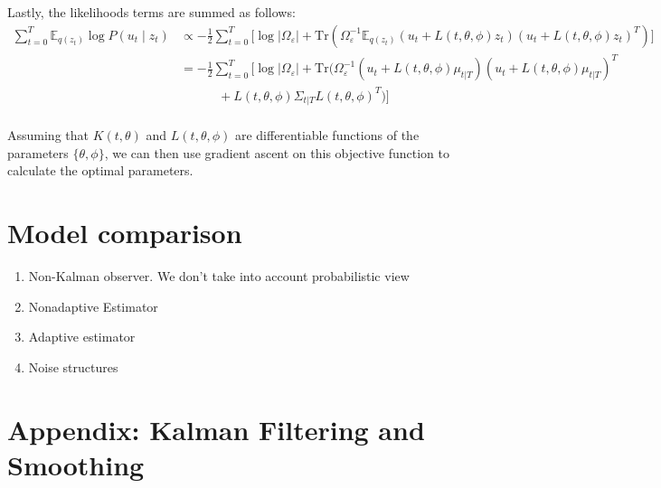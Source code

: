 \documentclass[11pt, reqno]{article}
\numberwithin{equation}{section}
\begin{document}
Lastly, the likelihoods terms are summed as follows:
\begin{align*}
\sum_{t=0}^T \mathbb{E}_{q(z_t)} \log P(u_t \mid z_t) 
&\propto - \frac{1}{2} \sum_{t=0}^T \Bigg[\log |\Omega_\varepsilon|  + \mathrm{Tr}\left( \Omega_\varepsilon^{-1} \mathbb{E}_{q(z_t)} (u_t + L(t,\theta,\phi)z_t )(u_t + L(t,\theta,\phi)z_t)^T \right) \Bigg] \\
&= - \frac{1}{2} \sum_{t=0}^T \Bigg[\log |\Omega_\varepsilon|  + \mathrm{Tr}\Bigg( \Omega_\varepsilon^{-1} (u_t + L(t,\theta,\phi)\mu_{t|T} )(u_t + L(t,\theta,\phi)\mu_{t|T})^T \\
&\hspace{3em}+  L(t,\theta,\phi) \Sigma_{t|T} L(t,\theta,\phi)^T\Bigg) \Bigg] \\
\end{align*}

Assuming that $K(t,\theta)$ and $L(t,\theta,\phi)$ are differentiable functions of the parameters $\{\theta, \phi\}$, we can then use gradient ascent on this objective function to calculate the optimal parameters. 

\section{Model comparison} 
\begin{enumerate}
\item Non-Kalman observer. We don't take into account probabilistic view
\item Nonadaptive Estimator
\item Adaptive estimator
\item Noise structures
\end{enumerate}

\section{Appendix: Kalman Filtering and Smoothing}
\end{document}
